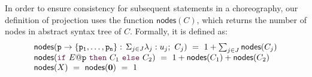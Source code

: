 \smallskip

%
In order to ensure consistency for subsequent statements in a
choreography, our definition of projection uses the function
\( \mathsf{nodes}(C) \), which returns the number of nodes in abstract
syntax tree of \( C \). Formally, it is defined as:
\begin{displaymath}
  \begin{array}{llll}
    \mathsf{nodes}(\interact{p}{\role p_1,\ldots,\role p_n})\ =\ 1+\sum_{j\in J}\mathsf{nodes}(C_j)\\
    \mathsf{nodes}(\ifTE {E}{p}{C_1}{C_2})\ =\ 1+\mathsf{nodes}(C_1)+\mathsf{nodes}(C_2)\\
    \mathsf{nodes}(X)\ =\ 
    \mathsf{nodes}(\CEnd)\ =\ 1
  \end{array}
\end{displaymath}

